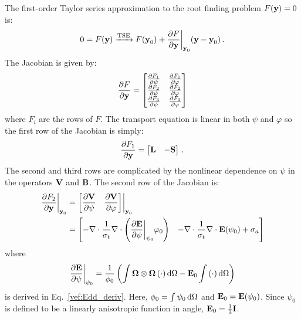 \documentclass[../doc.tex]{subfiles}
\begin{document}
The first-order Taylor series approximation to the root finding problem $F(\boldsymbol{\mathrm{y}}) = 0$ is: 
	\begin{equation} \label{smm:smm_root}
		0 = F(\boldsymbol{\mathrm{y}}) \xrightarrow{\text{TSE}} F(\boldsymbol{\mathrm{y}}_0) + \frac{\partial F}{\partial \boldsymbol{\mathrm{y}}}\biggr\rvert_{\boldsymbol{\mathrm{y}}_0}(\boldsymbol{\mathrm{y}} - \boldsymbol{\mathrm{y}}_0) \,. 
	\end{equation}
The Jacobian is given by: 
	\begin{equation}
		\frac{\partial F}{\partial \boldsymbol{\mathrm{y}}} = \begin{bmatrix} 
			\frac{\partial F_1}{\partial \psi} & \frac{\partial F_1}{\partial \varphi} \\ 
			\frac{\partial F_2}{\partial \psi} & \frac{\partial F_2}{\partial \varphi} \\ 
			\frac{\partial F_3}{\partial \psi} & \frac{\partial F_3}{\partial \varphi} 
		\end{bmatrix} 
	\end{equation}
where $F_i$ are the rows of $F$. The transport equation is linear in both $\psi$ and $\varphi$ so the first row of the Jacobian is simply: 
	\begin{equation}
		\frac{\partial F_1}{\partial \boldsymbol{\mathrm{y}}} = \begin{bmatrix} 
			\boldsymbol{\mathrm{L}} & -\boldsymbol{\mathrm{S}} 
		\end{bmatrix} \,. 
	\end{equation}
The second and third rows are complicated by the nonlinear dependence on $\psi$ in the operators $\boldsymbol{\mathrm{V}}$ and $\boldsymbol{\mathrm{B}}$. The second row of the Jacobian is: 
	\begin{equation}
	\begin{aligned}
		\frac{\partial F_2}{\partial \boldsymbol{\mathrm{y}}}\biggr\rvert_{\boldsymbol{\mathrm{y}}_0} &= \begin{bmatrix} 
			\displaystyle\frac{\partial \boldsymbol{\mathrm{V}}}{\partial \psi} & \displaystyle\frac{\partial \boldsymbol{\mathrm{V}}}{\partial \varphi} 
		\end{bmatrix} \biggr\rvert_{\boldsymbol{\mathrm{y}}_0} \\
		&= \begin{bmatrix} 
			\displaystyle-\nabla\cdot\frac{1}{\sigma_t}\nabla\cdot\left( \frac{\partial \boldsymbol{\mathrm{E}}}{\partial \psi}\biggr\rvert_{\psi_0}\varphi_0 \right) & 
			\displaystyle-\nabla\cdot\frac{1}{\sigma_t}\nabla\cdot\boldsymbol{\mathrm{E}}(\psi_0) + \sigma_a 
		\end{bmatrix} 
	\end{aligned}
	\end{equation}
where 
	\begin{equation}
	 	\frac{\partial \boldsymbol{\mathrm{E}}}{\partial \psi}\biggr\rvert_{\psi_0} = \frac{1}{\phi_0}\left( \int \boldsymbol{\Omega}\otimes\boldsymbol{\Omega}\left( \cdot \right)\mathop{}\!\mathrm{d}\Omega - \boldsymbol{\mathrm{E}}_0\int \left( \cdot \right)\mathop{}\!\mathrm{d}\Omega \right)
	\end{equation} 
is derived in Eq.~\ref{vef:Edd_deriv}. Here, $\phi_0 = \int \psi_0 \mathop{}\!\mathrm{d} \Omega$ and $\boldsymbol{\mathrm{E}}_0 = \boldsymbol{\mathrm{E}}(\psi_0)$. Since $\psi_0$ is defined to be a linearly anisotropic function in angle, $\boldsymbol{\mathrm{E}}_0 = \frac{1}{3}\boldsymbol{\mathrm{I}}$. 
\end{document}
